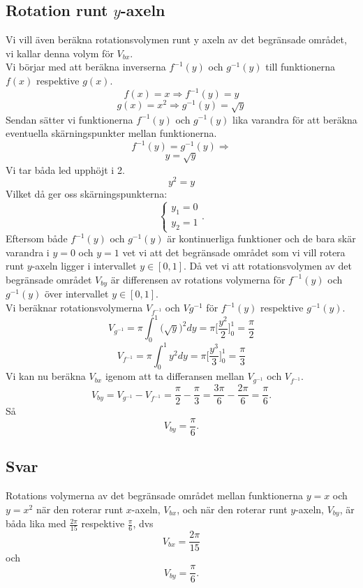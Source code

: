\documentclass[11pt]{article}
\begin{document}
\subsection{Rotation runt $y$-axeln}
Vi vill även beräkna rotationsvolymen runt y axeln av det begränsade området, vi kallar denna volym för $V_{bx}$.\\

Vi börjar med att beräkna inverserna $f^{-1}(y)$ och $g^{-1}(y)$ till funktionerna $f(x)$ respektive $g(x)$.
$$f(x) = x \Rightarrow f^{-1}(y) = y$$
$$g(x) = x^2 \Rightarrow g^{-1}(y) = \sqrt{y}$$
Sendan sätter vi funktionerna $f^{-1}(y)$ och $g^{-1}(y)$ lika varandra för att beräkna eventuella skärningspunkter mellan funktionerna.
$$ f^{-1}(y) = g^{-1}(y) \Rightarrow$$
$$ y = \sqrt{y} $$
Vi tar båda led upphöjt i 2.
$$ y^2 = y$$
Vilket då ger oss skärningspunkterna:
$$\left\{\begin{array}{c}
y_1 = 0 \\ y_2 = 1
\end{array}\right. .$$ 
Eftersom både $f^{-1}(y)$ och $g^{-1}(y)$ är kontinuerliga funktioner och de bara skär varandra i $y=0$ och $y=1$ vet vi att det begränsade området som vi vill rotera runt $y$-axeln ligger  i intervallet $y\in[0,1]$. Då vet vi att rotationsvolymen av det begränsade området $V_{by}$ är differensen av rotations volymerna för $f^{-1}(y)$ och $g^{-1}(y)$ över intervallet $y\in[0,1]$.\\
Vi beräknar rotationsvolymerna $V_{f^{-1}}$ och $V{g^{-1}}$ för $f^{-1}(y)$ respektive $g^{-1}(y)$.
$$V_{g^{-1}} = \pi \int_0^1 \Big(\sqrt{y}\Big)^2 dy = \pi \Big[\frac{ y^{2}}{2}\Big]_0^1 = \frac{\pi}{2}$$
$$V_{f^{-1}} = \pi \int_0^1 y^2 dy = \pi\Big[\frac{y^3}{3}\Big]_0^1 = \frac{\pi}{3}$$
Vi kan nu beräkna $V_{bx}$ igenom att ta differansen mellan $V_{g^{-1}}$ och $V_{f^{-1}}$.
$$V_{by} = V_{g^{-1}} - V_{f^{-1}} =\frac{\pi}{2} - \frac{\pi}{3} = \frac{3\pi}{6} - \frac{2\pi}{6} = \frac{\pi}{6}.$$
Så
$$V_{by} =  \frac{\pi}{6}.$$
\subsection{Svar}
Rotations volymerna av det begränsade området mellan funktionerna $y = x$ och $y = x^2$ när den roterar runt $x$-axeln, $V_{bx}$, och när den roterar runt $y$-axeln, $V_{by}$, är båda lika med $\frac{2\pi}{15}$ respektive $\frac{\pi}{6}$, dvs
$$V_{bx} = \frac{2\pi}{15} $$
och
$$ V_{by} = \frac{\pi}{6}.$$
\end{document}
